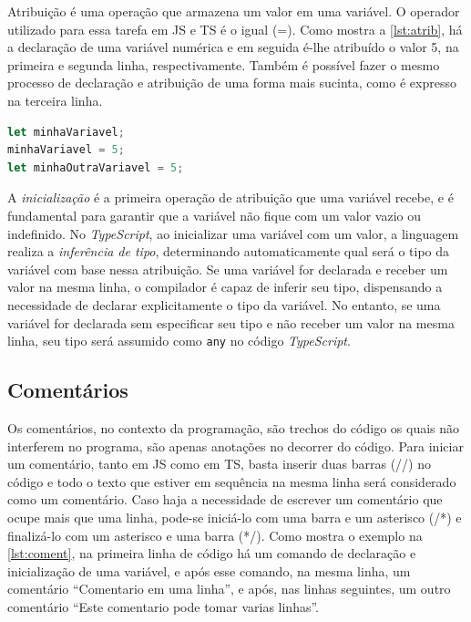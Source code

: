 Atribuição é uma operação que armazena um valor em uma variável. O operador utilizado para essa tarefa em JS e TS é o igual (=). Como mostra a \autoref{lst:atrib}, há a declaração de uma variável numérica e em seguida é-lhe atribuído o valor 5, na primeira e segunda linha, respectivamente. Também é possível fazer o mesmo processo de declaração e atribuição de uma forma mais sucinta, como é expresso na terceira linha.


\begin{lstlisting}[language=TypeScript, caption=Exemplo de Atribuição em JS e TS., label=lst:atrib]
let minhaVariavel;
minhaVariavel = 5;
let minhaOutraVariavel = 5;
\end{lstlisting}

A \emph{inicialização} é a primeira operação de atribuição que uma variável recebe, e é fundamental para garantir que a variável não fique com um valor vazio ou indefinido. No \textit{TypeScript}, ao inicializar uma variável com um valor, a linguagem realiza a \emph{inferência de tipo}, determinando automaticamente qual será o tipo da variável com base nessa atribuição. Se uma variável for declarada e receber um valor na mesma linha, o compilador é capaz de inferir seu tipo, dispensando a necessidade de declarar explicitamente o tipo da variável. No entanto, se uma variável for declarada sem especificar seu tipo e não receber um valor na mesma linha, seu tipo será assumido como \texttt{any} no código \textit{TypeScript}.

\subsection{Comentários}

Os comentários, no contexto da programação, são trechos do código os quais não interferem no programa, são apenas anotações no decorrer do código. Para iniciar um comentário, tanto em JS como em TS, basta inserir duas barras (//) no código e todo o texto que estiver em sequência na mesma linha será considerado como um comentário. Caso haja a necessidade de escrever um comentário que ocupe mais que uma linha, pode-se iniciá-lo com uma barra e um asterisco (/*) e finalizá-lo com um asterisco e uma barra (*/). Como mostra o exemplo na \autoref{lst:coment}, na primeira linha de código há um comando de declaração e inicialização de uma variável, e após esse comando, na mesma linha, um comentário ``Comentario em uma linha'', e após, nas linhas seguintes, um outro comentário ``Este comentario pode tomar varias linhas''.

